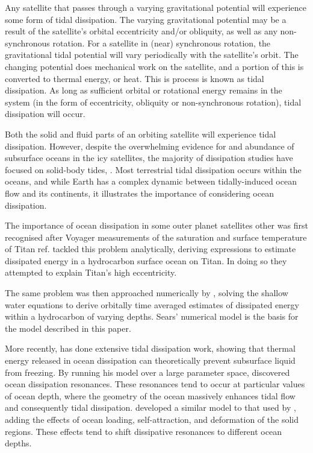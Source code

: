 Any satellite that passes through a varying gravitational potential will experience some form of tidal dissipation. The varying gravitational potential may be a result of the satellite's orbital eccentricity and/or obliquity, as well as any non-synchronous rotation. For a satellite in (near) synchronous rotation, the gravitational tidal potential will vary periodically with the satellite's orbit. The changing potential does mechanical work on the satellite, and a portion of this is converted to thermal energy, or heat. This is process is known as tidal dissipation. As long as sufficient orbital or rotational energy remains in the system (in the form of eccentricity, obliquity or non-synchronous rotation), tidal dissipation will occur.

Both the solid and fluid parts of an orbiting satellite will experience tidal dissipation. 
However, despite the overwhelming evidence for and abundance of subsurface oceans in the icy satellites, the majority of dissipation studies have focused on solid-body tides, \citep[e.g.,][]{moore2000tidal, tobie2005tidal,roberts2008tidal, beuthe2013spatial}.
Most terrestrial tidal dissipation occurs within the oceans, and while Earth has a complex dynamic between tidally-induced ocean flow and its continents, it illustrates the importance of considering ocean dissipation.

The importance of ocean dissipation in some outer planet satellites other was first recognised after Voyager measurements of the saturation and surface temperature of Titan {ref}. \citet{sagan1982tide} tackled this problem analytically, deriving expressions to estimate dissipated energy in a hydrocarbon surface ocean on Titan. In doing so they attempted to explain Titan's high eccentricity.

The same problem was then approached numerically by \citet{sears1995tidal}, solving the shallow water equations to derive orbitally time averaged estimates of dissipated energy within a hydrocarbon of varying depths. Sears' numerical model is the basis for the model described in this paper. 

More recently, \citet{tyler2008strong,tyler2009ocean,tyler2011tidal,tyler2014comparative} has done extensive tidal dissipation work, showing that thermal energy released in ocean dissipation can theoretically prevent subsurface liquid from freezing. By running his model over a large parameter space, \citet{tyler2011tidal} discovered ocean dissipation resonances. These resonances tend to occur at particular values of ocean depth, where the geometry of the ocean massively enhances tidal flow and consequently tidal dissipation. \citet{matsuyama2014tidal} developed a similar model to that used by \citet{tyler2011tidal}, adding the effects of ocean loading, self-attraction, and deformation of the solid regions. These effects tend to shift dissipative resonances to different ocean depths.

